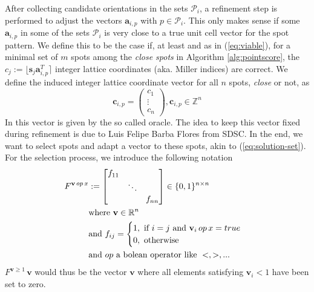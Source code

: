\documentclass[a4paper,10pt]{article}
\newcommand{\vect}[1]{\mathbf{#1}}
\newcommand{\round}[1]{\lfloor #1 \rceil}
\newcommand{\filter}[1]{F^{#1}}
\begin{document}
After collecting candidate orientations in the sets $\mathcal{P}_i$, a refinement step is performed to adjust the vectors $\vect{a}_{i,p}$ with $p\in \mathcal{P}_i$. This only makes sense if some $\vect{a}_{i,p}$ in some of the sets $\mathcal{P}_i$ is very close to a true unit cell vector for the spot pattern. We define this to be the case if, at least and as in (\ref{eq:viable}), for a minimal set of $m$ spots among the \emph{close spots} in Algorithm \ref{alg:pointscore}, the $c_j := \round{\vect{s}_j \vect{a}_{i,p}^T}$ integer lattice coordinates (aka. Miller indices) are correct. We define the induced integer lattice coordinate vector for all $n$ spots, \emph{close} or not, as
%
\[
\vect{c}_{i,p} = \begin{pmatrix} c_1 \\ \vdots \\ c_n \end{pmatrix}, \vect{c}_{i,p}\in \mathbb{Z}^{n}
\]
%
In \cite{toro-indexer} this vector is given by the so called oracle. The idea to keep this vector fixed during refinement is due to Luis Felipe Barba Flores from SDSC. In the end, we want to select spots and adapt a vector to these spots, akin to (\ref{eq:solution-set}). For the selection process, we introduce the following notation
%
\begin{align}
\filter{\vect{v}\, op\, x} &:= \begin{bmatrix}
  f_{11} &        &        \\
         & \ddots &        \\
         &        & f_{nn}
\end{bmatrix} \in \{0,1\}^{n\times n} \\
&\text{where } \vect{v} \in \mathbb{R}^n \notag \\
&\text{and } f_{ij} = \begin{cases}
  1,\text{ if } i=j\text{ and }\vect{v}_i\, op\, x = true \\
  0,\text{ otherwise}
\end{cases}  \notag \\
&\text{and }op\text{ a bolean operator like } <, >, ... \notag
\end{align}
%
$\filter{\vect{v} \geq 1}\,\vect{v}$ would thus be the vector $\vect{v}$ where all elements satisfying $\vect{v}_i < 1$ have been set to zero.
\end{document}

